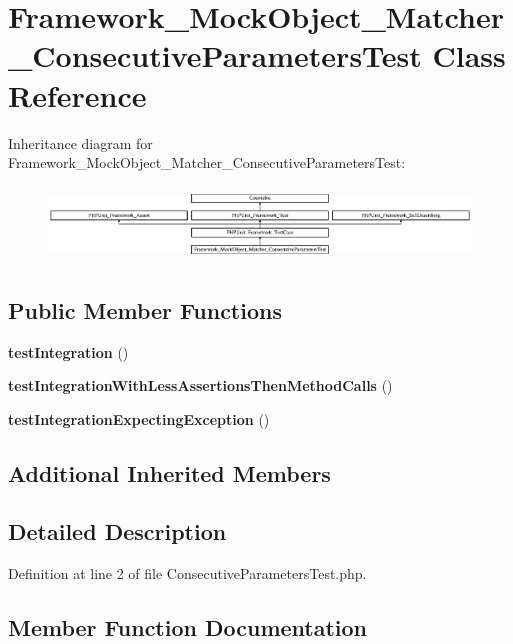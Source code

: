 \section{Framework\+\_\+\+Mock\+Object\+\_\+\+Matcher\+\_\+\+Consecutive\+Parameters\+Test Class Reference}
\label{class_framework___mock_object___matcher___consecutive_parameters_test}
Inheritance diagram for Framework\+\_\+\+Mock\+Object\+\_\+\+Matcher\+\_\+\+Consecutive\+Parameters\+Test\+:\begin{figure}[H]
\begin{center}
\leavevmode
\includegraphics[height=1.985816cm]{class_framework___mock_object___matcher___consecutive_parameters_test}
\end{center}
\end{figure}
\subsection*{Public Member Functions}
\begin{DoxyCompactItemize}
\item 
{\bf test\+Integration} ()
\item 
{\bf test\+Integration\+With\+Less\+Assertions\+Then\+Method\+Calls} ()
\item 
{\bf test\+Integration\+Expecting\+Exception} ()
\end{DoxyCompactItemize}
\subsection*{Additional Inherited Members}


\subsection{Detailed Description}


Definition at line 2 of file Consecutive\+Parameters\+Test.\+php.



\subsection{Member Function Documentation}
